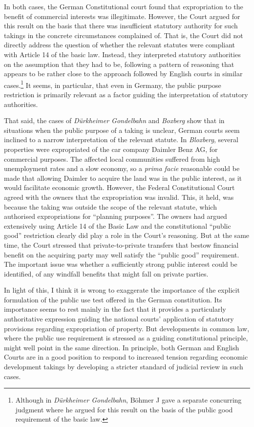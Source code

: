 {In both cases, the German Constitutional court found that expropriation to the benefit of commercial interests was illegitimate. However, the Court argued for this result on the basis that there was insufficient statutory authority for such takings in the concrete circumstances complained of. That is, the Court did not directly address the question of whether the relevant statutes were compliant with Article 14 of the basic law. Instead, they interpreted statutory authorities on the assumption that they had to be, following a pattern of reasoning that appears to be rather close to the approach followed by English courts in similar cases.\footnote{Although in {\it Dürkheimer Gondelbahn}, Böhmer J gave a separate concurring judgment where he argued for this result on the basis of the public good requirement of the basic law.} It seems, in particular, that even in Germany, the public purpose restriction is primarily relevant as a factor guiding the interpretation of statutory authorities.

That said, the cases of {\it D{\"u}rkheimer Gondelbahn} and {\it Boxberg} show that in situations when the public purpose of a taking is unclear, German courts seem inclined to  a narrow interpretation of the relevant statute. In {\it Bloxberg}, several properties were expropriated  of the car company Daimler Benz AG, for commercial purposes. The affected local communities suffered from high unemployment rates and a slow economy, so a {\it prima facie} reasonable  could be made that allowing Daimler to acquire the land was in the public interest, as it would facilitate economic growth. However, the Federal Constitutional Court agreed with the owners that the expropriation was invalid. This, it held, was because the taking was outside the scope of the relevant statute, which authorised expropriations for ``planning purposes''. The owners had argued extensively using Article 14 of the Basic Law and the constitutional ``public good'' restriction clearly did play a role in the Court's reasoning. But at the same time, the Court stressed that private-to-private transfers that bestow financial benefit on the acquiring party may well satisfy the ``public good'' requirement. The important issue was whether a sufficiently strong public interest could be identified,  of any windfall benefits that might fall on private parties.

In light of this, I think it is wrong to exaggerate the importance of the explicit formulation of the public use test offered in the German constitution. Its importance seems to rest mainly in the fact that it provides a particularly authoritative expression guiding the national courts' application of statutory provisions regarding expropriation of property. But developments in common law, where the public use requirement is stressed as a guiding constitutional principle, might well point in the same direction. In principle, both German and English Courts are in a good position to respond to increased tension regarding economic development takings by developing a stricter standard of judicial review in such cases.

}

